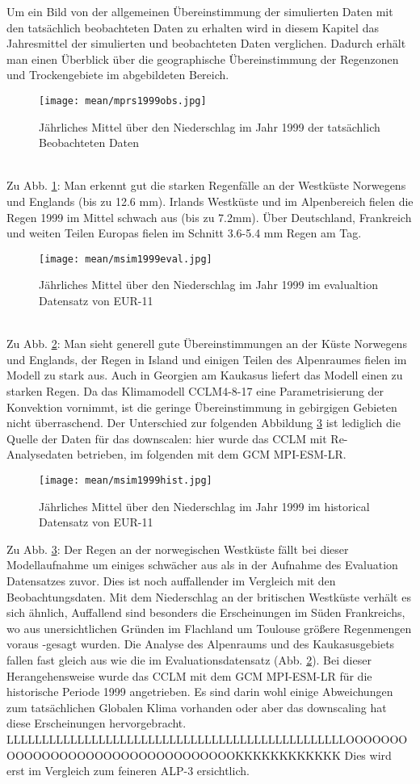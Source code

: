 Um ein Bild von der allgemeinen Übereinstimmung der simulierten Daten mit den tatsächlich beobachteten Daten zu erhalten wird in diesem Kapitel das Jahresmittel der simulierten und beobachteten Daten verglichen. Dadurch erhält man einen Überblick über die geographische Übereinstimmung der Regenzonen und Trockengebiete im abgebildeten Bereich.
\begin{figure}[h]
	\texttt{[image: mean/mprs1999obs.jpg]}
	\caption{Jährliches Mittel über den Niederschlag im Jahr 1999 der tatsächlich Beobachteten Daten}
	\label{fig:mobs99}
\end{figure}
\\
Zu Abb. \ref{fig:mobs99}: Man erkennt gut die starken Regenfälle an der Westküste Norwegens und Englands (bis zu 12.6 mm). Irlands Westküste und im Alpenbereich fielen die Regen 1999 im Mittel schwach aus (bis zu 7.2mm). Über Deutschland, Frankreich und weiten Teilen Europas fielen im Schnitt 3.6-5.4 mm Regen am Tag.\\
\begin{figure}[h]
	\texttt{[image: mean/msim1999eval.jpg]}
	\caption{Jährliches Mittel über den Niederschlag im Jahr 1999 im evalualtion Datensatz von EUR-11}
	\label{fig:meval99}
\end{figure}
 \\
Zu Abb. \ref{fig:meval99}: Man sieht generell gute Übereinstimmungen an der Küste Norwegens und Englands, der Regen in Island und einigen Teilen des Alpenraumes fielen im Modell zu stark aus. Auch in Georgien am Kaukasus liefert das Modell einen zu starken Regen. Da das Klimamodell CCLM4-8-17 eine Parametrisierung der Konvektion vornimmt, ist die geringe Übereinstimmung in gebirgigen Gebieten nicht überraschend. Der Unterschied zur folgenden Abbildung \ref{fig:mhist99} ist lediglich die Quelle der Daten für das downscalen: hier wurde das CCLM mit Re-Analysedaten betrieben, im folgenden mit dem GCM MPI-ESM-LR.\\

\begin{figure}[h]
	\texttt{[image: mean/msim1999hist.jpg]}
	\caption{Jährliches Mittel über den Niederschlag im Jahr 1999 im historical Datensatz von EUR-11}
	\label{fig:mhist99}
\end{figure}
Zu Abb. \ref{fig:mhist99}: Der Regen an der norwegischen Westküste fällt bei dieser Modellaufnahme um einiges schwächer aus als in der Aufnahme des Evaluation Datensatzes zuvor. Dies ist noch auffallender im Vergleich mit den Beobachtungsdaten. Mit dem Niederschlag an der britischen Westküste verhält es sich ähnlich, Auffallend sind besonders die Erscheinungen im Süden Frankreichs, wo aus unersichtlichen Gründen im Flachland um Toulouse größere Regenmengen \glqq voraus \grqq-gesagt wurden. Die Analyse des Alpenraums und des Kaukasusgebiets fallen fast gleich aus wie die im Evaluationsdatensatz (Abb. \ref{fig:meval99}). Bei dieser Herangehensweise wurde das CCLM mit dem GCM MPI-ESM-LR für die historische Periode 1999 angetrieben. Es sind darin wohl einige Abweichungen zum tatsächlichen Globalen Klima vorhanden oder aber das downscaling hat diese Erscheinungen hervorgebracht.
LLLLLLLLLLLLLLLLLLLLLLLLLLLLLLLLLLLLLLLLLLLLLLLLOOOOOOOOOOOOOOOOOOOOOOOOOOOOOOOOOKKKKKKKKKKKK Dies wird erst im Vergleich zum feineren ALP-3 ersichtlich.
